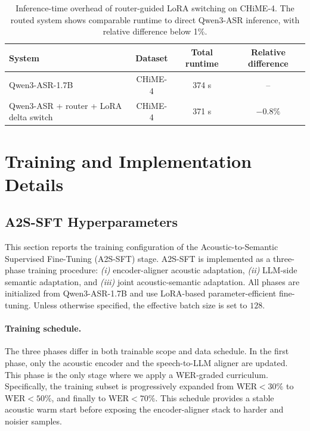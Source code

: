 \documentclass{llmxive}
\begin{document}
\begin{table}[t]
\centering
\small
\begin{tabular}{lccc}
\toprule
\textbf{System} & \textbf{Dataset} & \textbf{Total runtime} & \textbf{Relative difference} \\
\midrule
Qwen3-ASR-1.7B
& CHiME-4 & 374 s & -- \\

Qwen3-ASR + router + LoRA delta switch
& CHiME-4 & 371 s & $-0.8\%$ \\
\bottomrule
\end{tabular}
\caption{Inference-time overhead of router-guided LoRA switching on CHiME-4. The routed system shows comparable runtime to direct Qwen3-ASR inference, with relative difference below 1\%.}
\label{tab:router_latency}
\end{table}



\section{Training and Implementation Details}
\subsection{A2S-SFT Hyperparameters}
\label{app:a2s_sft_hparams}

This section reports the training configuration of the Acoustic-to-Semantic
Supervised Fine-Tuning (A2S-SFT) stage. A2S-SFT is implemented as a three-phase
training procedure: \textit{(i)} encoder-aligner acoustic adaptation,
\textit{(ii)} LLM-side semantic adaptation, and \textit{(iii)} joint
acoustic-semantic adaptation. All phases are initialized from Qwen3-ASR-1.7B and
use LoRA-based parameter-efficient fine-tuning. Unless otherwise specified, the
effective batch size is set to $128$.

\paragraph{Training schedule.}
The three phases differ in both trainable scope and data schedule. In the first
phase, only the acoustic encoder and the speech-to-LLM aligner are updated. This
phase is the only stage where we apply a WER-graded curriculum. Specifically, the
training subset is progressively expanded from $\mathrm{WER}<30\%$ to
$\mathrm{WER}<50\%$, and finally to $\mathrm{WER}<70\%$. This schedule provides a
stable acoustic warm start before exposing the encoder-aligner stack to harder
and noisier samples.
\end{document}

